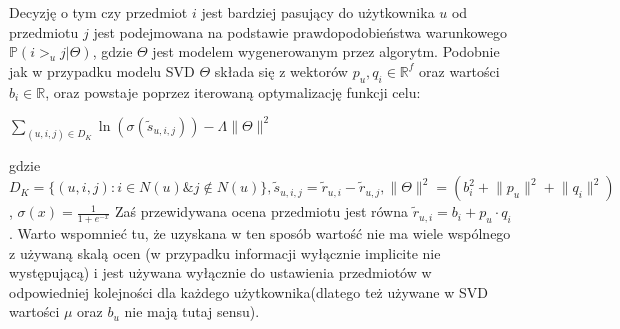 \documentclass{pracamgr}
\begin{document}
    Decyzję o tym czy przedmiot $i$ jest bardziej pasujący do użytkownika $u$ od przedmiotu $j$ jest podejmowana na podstawie prawdopodobieństwa warunkowego
    $\mathbb{P}(i>_u j|\Theta)$, gdzie $\Theta$ jest modelem wygenerowanym przez algorytm.
    Podobnie jak w przypadku modelu SVD $\Theta$ składa się z wektorów
    $p_u,q_i\in\mathbb{R}^f$ oraz wartości $b_i\in\mathbb{R}$, oraz powstaje poprzez iterowaną
    optymalizację funkcji celu:
    \begin{center}
     $\sum\limits_{(u,i,j)\in D_K}\ln{(\sigma(\tilde{s}_{u,i,j}))}-\Lambda\lVert\Theta\rVert^2$
    \end{center}
    gdzie $D_K=\{(u,i,j):i\in N(u) \& j\notin N(u)\}, \tilde{s}_{u,i,j}=\tilde{r}_{u,i}-\tilde{r}_{u,j}, \lVert\Theta\rVert^2=(b_i^2+\lVert p_u\rVert^2+\lVert q_i\rVert^2)$,
    $\sigma(x)=\frac{1}{1+e^{-x}}$\newline
    Zaś przewidywana ocena przedmiotu jest równa $\tilde{r}_{u,i}=b_i+p_u\cdot q_i$.\newline
    Warto wspomnieć tu, że uzyskana w ten sposób wartość nie ma wiele wspólnego z używaną skalą ocen 
    (w przypadku informacji wyłącznie implicite nie występującą) i jest używana wyłącznie do ustawienia przedmiotów w odpowiedniej kolejności
    dla każdego użytkownika(dlatego też używane w SVD wartości $\mu$ oraz $b_u$ nie mają tutaj sensu).\newline
    
\end{document}
